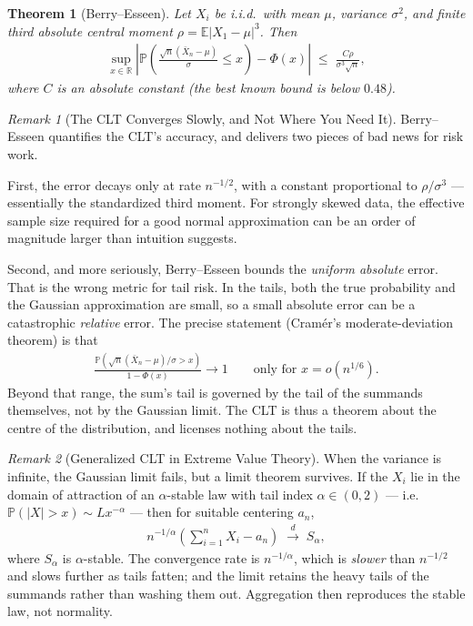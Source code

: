 \documentclass[11pt]{article}
\theoremstyle{definition}
\theoremstyle{plain}
\newtheorem{theorem}{Theorem}[section]
\theoremstyle{remark}
\newtheorem{remark}{Remark}[section]
\begin{document}
\begin{theorem}[Berry--Esseen]
    Let $X_i$ be i.i.d.\ with mean $\mu$, variance $\sigma^2$, and finite third absolute central moment $\rho = \mathbb{E}|X_1-\mu|^3$. Then
    \begin{align}
        \sup_{x \in \mathbb{R}} \left| \mathbb{P}\!\left(\frac{\sqrt{n}(\bar{X}_n - \mu)}{\sigma} \leq x\right) - \Phi(x) \right| \;\leq\; \frac{C\rho}{\sigma^3\sqrt{n}},
    \end{align}
    where $C$ is an absolute constant (the best known bound is below $0.48$).
\end{theorem}

\begin{remark}[The CLT Converges Slowly, and Not Where You Need It]
    Berry--Esseen quantifies the CLT's accuracy, and delivers two pieces of bad news for risk work.

    First, the error decays only at rate $n^{-1/2}$, with a constant proportional to $\rho/\sigma^3$ --- essentially the standardized third moment. For strongly skewed data, the effective sample size required for a good normal approximation can be an order of magnitude larger than intuition suggests. 

    Second, and more seriously, Berry--Esseen bounds the \emph{uniform absolute} error. That is the wrong metric for tail risk. In the tails, both the true probability and the Gaussian approximation are small, so a small absolute error can be a catastrophic \emph{relative} error. The precise statement (Cram\'er's moderate-deviation theorem) is that
    \begin{align}
        \frac{\mathbb{P}\left(\sqrt{n}(\bar{X}_n-\mu)/\sigma > x\right)}{1 - \Phi(x)} \to 1
        \qquad \text{only for } x = o(n^{1/6}).
    \end{align}
    Beyond that range, the sum's tail is governed by the tail of the summands themselves, not by the Gaussian limit. The CLT is thus a theorem about the centre of the distribution, and licenses nothing about the tails.
\end{remark}

\begin{remark}[Generalized CLT in Extreme Value Theory]
    When the variance is infinite, the Gaussian limit fails, but a limit theorem survives. If the $X_i$ lie in the domain of attraction of an $\alpha$-stable law with tail index $\alpha \in (0,2)$ --- i.e.\ $\mathbb{P}(|X| > x) \sim Lx^{-\alpha}$ --- then for suitable centering $a_n$,
    \begin{align}
        n^{-1/\alpha}\left(\sum_{i=1}^n X_i - a_n\right) \;\xrightarrow{d}\; S_\alpha,
    \end{align}
    where $S_\alpha$ is $\alpha$-stable. The convergence rate is $n^{-1/\alpha}$, which is \emph{slower} than $n^{-1/2}$ and slows further as tails fatten; and the limit retains the heavy tails of the summands rather than washing them out. Aggregation then reproduces the stable law, not normality.
\end{remark}
\end{document}

